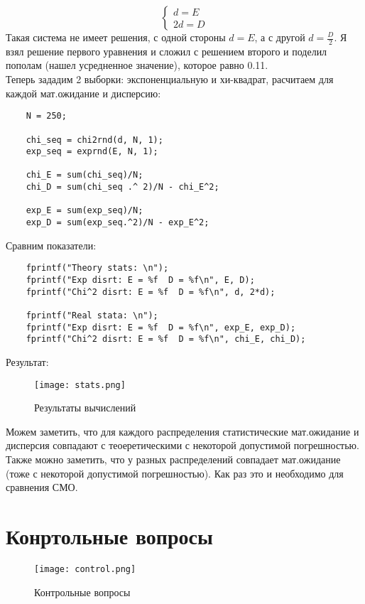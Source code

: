 \[
\begin{cases}
d = E \\
2d = D
\end{cases}
\]
Такая система не имеет решения, с одной стороны $d = E$, а с другой $d = \frac{D}{2}$. Я взял решение первого уравнения и сложил
с решением второго и поделил пополам (нашел усредненное значение), которое равно 0.11. \\

Теперь зададим 2 выборки: экспоненциальную и хи-квадрат, расчитаем для каждой мат.ожидание и дисперсию:

\begin{lstlisting}
    N = 250;

    chi_seq = chi2rnd(d, N, 1);
    exp_seq = exprnd(E, N, 1);

    chi_E = sum(chi_seq)/N;
    chi_D = sum(chi_seq .^ 2)/N - chi_E^2;

    exp_E = sum(exp_seq)/N;
    exp_D = sum(exp_seq.^2)/N - exp_E^2;
\end{lstlisting}

Сравним показатели:

\begin{lstlisting}
    fprintf("Theory stats: \n");
    fprintf("Exp disrt: E = %f  D = %f\n", E, D);
    fprintf("Chi^2 disrt: E = %f  D = %f\n", d, 2*d);

    fprintf("Real stata: \n");
    fprintf("Exp disrt: E = %f  D = %f\n", exp_E, exp_D);
    fprintf("Chi^2 disrt: E = %f  D = %f\n", chi_E, chi_D);

\end{lstlisting}

Результат:


\begin{figure}[H]
    \centering
    \texttt{[image: stats.png]}
    \caption{Результаты вычислений}
\end{figure}

Можем заметить, что для каждого распределения статистические мат.ожидание и дисперсия совпадают с теоеретическими с некоторой
допустимой погрешностью. Также можно заметить, что у разных распределений совпадает мат.ожидание (тоже с некоторой
допустимой погрешностью). Как раз это и необходимо для сравнения СМО.

\section*{\textbf{Конртольные вопросы}}

\begin{figure}[H]
    \centering
    \texttt{[image: control.png]}
    \caption{Контрольные вопросы}
\end{figure}

